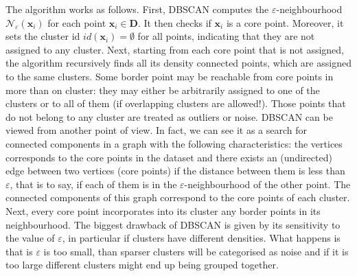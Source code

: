 \documentclass[a4paper]{article}
\begin{document}
	The algorithm works as follows. First, DBSCAN computes the $\varepsilon$-neighbourhood $\mathcal{N}_{\varepsilon} \left( \boldsymbol{x}_{i} \right)$ for each point $\boldsymbol{x}_{i} \in \boldsymbol{D}$. It then checks if $\boldsymbol{x}_{i}$ is a core point. Moreover, it sets the cluster id $id\left(\boldsymbol{x}_{i}\right) = \emptyset$ for all points, indicating that they are not assigned to any cluster.
	Next, starting from each core point that is not assigned, the algorithm recursively finds all its density connected points, which are assigned to the same clusters. Some border point may be reachable from core points in more than on cluster: they may either be arbitrarily assigned to one of the clusters or to all of them (if overlapping clusters are allowed!).
	Those points that do not belong to any cluster are treated as outliers or noise.
	DBSCAN can be viewed from another point of view. In fact, we can see it as a search for connected components in a graph with the following characteristics: the vertices corresponds to the core points in the dataset and there exists an (undirected) edge between two vertices (core points) if the distance between them is less than $\varepsilon$, that is to say, if each of them is in the $\varepsilon$-neighbourhood of the other point.
	The connected components of this graph correspond to the core points of each cluster. Next, every core point incorporates into its cluster any border points in its neighbourhood.
	The biggest drawback of DBSCAN is given by its sensitivity to the value of $\varepsilon$, in particular if clusters have different densities. What happens is that is $\varepsilon$ is too small, than sparser clusters will be categorised as noise and if it is too large different clusters might end up being grouped together.
\end{document}
